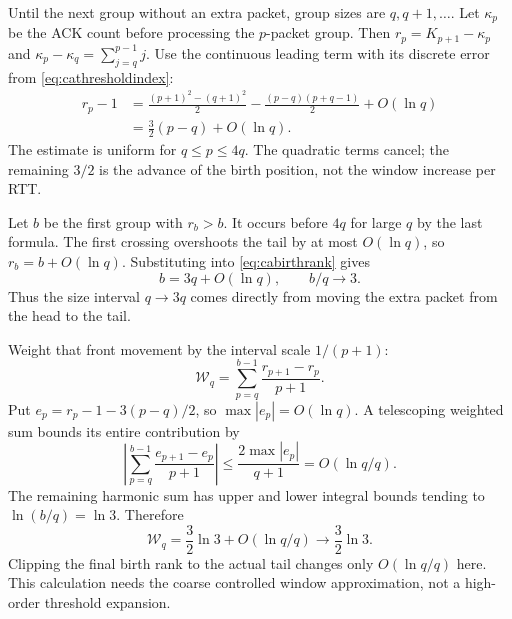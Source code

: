 \documentclass[sigconf,nonacm]{acmart}
\begin{document}
Until the next group without an extra packet, group sizes are
$q,q+1,\ldots$. Let $\kappa_p$ be the ACK count before processing the
$p$-packet group. Then $r_p=K_{p+1}-\kappa_p$ and
$\kappa_p-\kappa_q=\sum_{j=q}^{p-1}j$. Use the continuous leading term
with its discrete error from \eqref{eq:cathresholdindex}:
\begin{equation}\begin{aligned}
 r_p-1
 &=\frac{(p+1)^2-(q+1)^2}{2}
   -\frac{(p-q)(p+q-1)}2+O(\ln q)\\
 &=\frac32(p-q)+O(\ln q).
\end{aligned}\label{eq:cabirthrank}\end{equation}
The estimate is uniform for $q\le p\le4q$. The quadratic terms cancel;
the remaining $3/2$ is the advance of the birth position, not the window
increase per RTT.

Let $b$ be the first group with $r_b>b$. It occurs before $4q$ for large
$q$ by the last formula. The first crossing overshoots the tail by at
most $O(\ln q)$, so $r_b=b+O(\ln q)$. Substituting into
\eqref{eq:cabirthrank} gives
\begin{equation}
 b=3q+O(\ln q),\qquad b/q\longrightarrow3.
\end{equation}
Thus the size interval $q\to3q$ comes directly from moving the extra
packet from the head to the tail.

Weight that front movement by the interval scale $1/(p+1)$:
\begin{equation}
 \mathcal W_q=\sum_{p=q}^{b-1}\frac{r_{p+1}-r_p}{p+1}.
 \label{eq:cafrontwork}
\end{equation}
Put $e_p=r_p-1-3(p-q)/2$, so $\max|e_p|=O(\ln q)$. A telescoping
weighted sum bounds its entire contribution by
\[
 \left|\sum_{p=q}^{b-1}\frac{e_{p+1}-e_p}{p+1}\right|
 \le\frac{2\max|e_p|}{q+1}=O(\ln q/q).
\]
The remaining harmonic sum has upper and lower integral bounds tending
to $\ln(b/q)=\ln3$. Therefore
\begin{equation}
 \boxed{\mathcal W_q=\frac32\ln3+O(\ln q/q)
 \longrightarrow\frac32\ln3.}
 \label{eq:cafrontlimit}
\end{equation}
Clipping the final birth rank to the actual tail changes only
$O(\ln q/q)$ here. This calculation needs the coarse controlled window
approximation, not a high-order threshold expansion.
\end{document}
